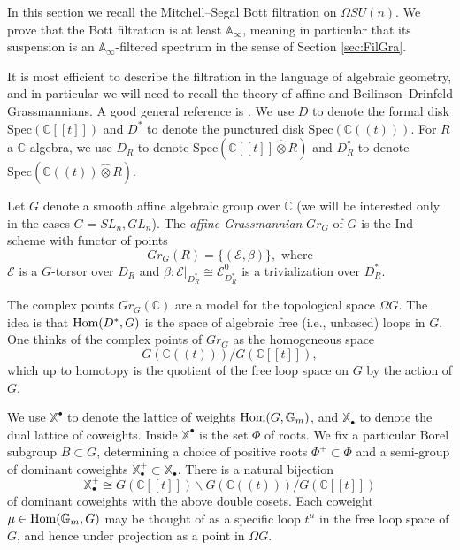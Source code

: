 In this section we recall the Mitchell--Segal Bott filtration \cite{MitchellLoopGroup} on $\Omega SU(n)$.  We prove that the Bott filtration is at least $\mathbb{A}_\infty$, meaning in particular that its suspension is an $\mathbb{A}_\infty$-filtered spectrum in the sense of Section \ref{sec:FilGra}.

It is most efficient to describe the filtration in the language of algebraic geometry, and in particular we will need to recall the theory of affine and Beilinson--Drinfeld Grassmannians.  A good general reference is \cite{Zhu}.  We use $D$ to denote the formal disk $\text{Spec}(\mathbb{C}[[t]])$ and $D^*$ to denote the punctured disk $\text{Spec}(\mathbb{C}((t)))$.  For $R$ a $\mathbb{C}$-algebra, we use $D_R$ to denote $\text{Spec}(\mathbb{C}[[t]] \hat{\otimes} R)$ and $D^*_R$ to denote $\text{Spec}(\mathbb{C}((t)) \hat{\otimes} R)$.

\begin{dfn}
Let $G$ denote a smooth affine algebraic group over $\mathbb{C}$ (we will be interested only in the cases $G=SL_n,GL_n$).  The \textit{affine Grassmannian} $Gr_G$ of $G$ is the Ind-scheme with functor of points
$$Gr_G(R) = \{(\mathcal{E},\beta)\},\text{ where}$$
$\mathcal{E}$ is a $G$-torsor over $D_{R}$ and $\beta:\mathcal{E}|_{D^*_{R}} \cong \mathcal{E}^0_{D^*_{R}}$ is a trivialization over $D^*_{R}$.
\end{dfn}

The complex points $Gr_G(\mathbb{C})$ are a model for the topological space $\Omega G$.  The idea is that $\operatorname{\text{Hom}}(D^*,G)$ is the space of algebraic free (i.e., unbased) loops in $G$.  One thinks of the complex points of $Gr_G$ as the homogeneous space
$$G(\mathbb{C}((t)))/G(\mathbb{C}[[t]]),$$
which up to homotopy is the quotient of the free loop space on $G$ by the action of $G$.  

We use $\mathbb{X}^{\bullet}$ to denote the lattice of weights $\operatorname{\text{Hom}}(G,\mathbb{G}_m)$, and $\mathbb{X}_{\bullet}$ to denote the dual lattice of coweights.  Inside $\mathbb{X}^{\bullet}$ is the set $\Phi$ of roots.  We fix a particular Borel subgroup $B \subset G$, determining a choice of positive roots $\Phi^+ \subset \Phi$ and a semi-group of dominant coweights $\mathbb{X}^+_\bullet \subset \mathbb{X}_\bullet$.  There is a natural bijection
$$\mathbb{X}_{\bullet}^+ \cong G(\mathbb{C}[[t]])\backslash G(\mathbb{C}((t)))/G(\mathbb{C}[[t]])$$
of dominant coweights with the above double cosets.  Each coweight $\mu \in \operatorname{\text{Hom}}(\mathbb{G}_m,G)$ may be thought of as a specific loop $t^{\mu}$ in the free loop space of $G$, and hence under projection as a point in $\Omega G$.

